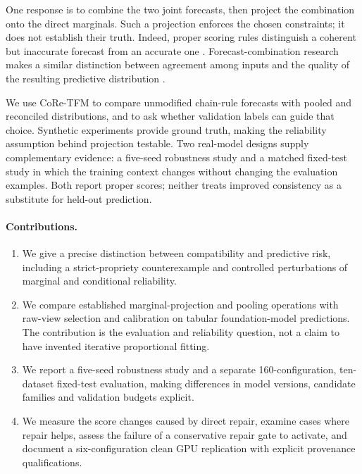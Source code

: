 \documentclass[a4paper,fleqn]{cas-sc}
\begin{document}
One response is to combine the two joint forecasts, then project the combination onto the direct marginals. Such a projection enforces the chosen constraints; it does not establish their truth. Indeed, proper scoring rules distinguish a coherent but inaccurate forecast from an accurate one \citep{brier1950,gneiting2007strictly,gneiting2007calibration}. Forecast-combination research makes a similar distinction between agreement among inputs and the quality of the resulting predictive distribution \citep{genest1986combining,ranjan2010combining,gneiting2013combining}.

We use CoRe-TFM to compare unmodified chain-rule forecasts with pooled and reconciled distributions, and to ask whether validation labels can guide that choice. Synthetic experiments provide ground truth, making the reliability assumption behind projection testable. Two real-model designs supply complementary evidence: a five-seed robustness study and a matched fixed-test study in which the training context changes without changing the evaluation examples. Both report proper scores; neither treats improved consistency as a substitute for held-out prediction.

\paragraph{Contributions.}
\begin{enumerate}
\item We give a precise distinction between compatibility and predictive risk, including a strict-propriety counterexample and controlled perturbations of marginal and conditional reliability.
\item We compare established marginal-projection and pooling operations with raw-view selection and calibration on tabular foundation-model predictions. The contribution is the evaluation and reliability question, not a claim to have invented iterative proportional fitting.
\item We report a five-seed robustness study and a separate 160-configuration, ten-dataset fixed-test evaluation, making differences in model versions, candidate families and validation budgets explicit.
\item We measure the score changes caused by direct repair, examine cases where repair helps, assess the failure of a conservative repair gate to activate, and document a six-configuration clean GPU replication with explicit provenance qualifications.
\end{enumerate}
\end{document}
